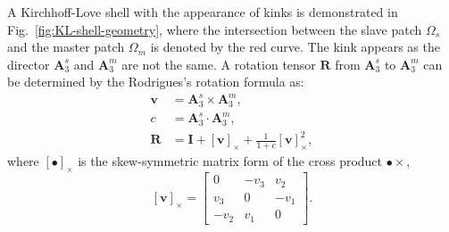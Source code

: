 \documentclass[preprint,12pt]{elsarticle}
\theoremstyle{remark}
\begin{document}
A Kirchhoff-Love shell with the appearance of kinks is demonstrated in Fig.~\ref{fig:KL-shell-geometry}, where the intersection between the slave patch $\Omega_s$ and the master patch $\Omega_m$ is denoted by the red curve. The kink appears as the director $\mathbf{A}_3^s$ and $\mathbf{A}_3^m$ are not the same. A rotation tensor $\mathbf{R}$ from $\mathbf{A}_3^s$ to $\mathbf{A}_3^m$ can be determined by the Rodrigues's rotation formula as:
\begin{align}
    \mathbf{v} &= \mathbf{A}_3^s\times\mathbf{A}_3^m,\\
    c &=  \mathbf{A}_3^s\cdot\mathbf{A}_3^m,\\
    \mathbf{R} &= \mathbf{I}+\left[\mathbf{v}\right]_{\times}+\frac{1}{1+c}\left[\mathbf{v}\right]_{\times}^2,
\end{align}
where $\left[\bullet\right]_{\times}$ is the skew-symmetric matrix form of the cross product ${\bullet}\times$,
\begin{equation}
    \left[\mathbf{v}\right]_{\times}=
    \begin{bmatrix}
        0 & -v_3 & v_2\\
        v_3 & 0 & -v_1\\
        -v_2 & v_1 & 0
    \end{bmatrix}.
\end{equation}
\end{document}
